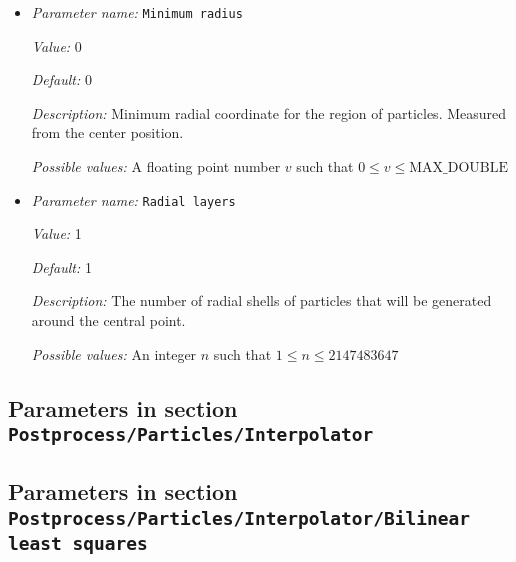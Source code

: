 \begin{itemize}
{\it Value:} 0


{\it Default:} 0


{\it Description:} Minimum longitude coordinate for the region of particles in degrees. Measured from the center position.


{\it Possible values:} A floating point number $v$ such that $0 \leq v \leq 360$
\item {\it Parameter name:} {\tt Minimum radius}
\label{parameters:Postprocess/Particles/Generator/Uniform radial/Minimum radius}


{\it Value:} 0


{\it Default:} 0


{\it Description:} Minimum radial coordinate for the region of particles. Measured from the center position.


{\it Possible values:} A floating point number $v$ such that $0 \leq v \leq \text{MAX\_DOUBLE}$
\item {\it Parameter name:} {\tt Radial layers}
\label{parameters:Postprocess/Particles/Generator/Uniform radial/Radial layers}


{\it Value:} 1


{\it Default:} 1


{\it Description:} The number of radial shells of particles that will be generated around the central point.


{\it Possible values:} An integer $n$ such that $1\leq n \leq 2147483647$
\end{itemize}

\subsection{Parameters in section \tt Postprocess/Particles/Interpolator}
\label{parameters:Postprocess/Particles/Interpolator}


\subsection{Parameters in section \tt Postprocess/Particles/Interpolator/Bilinear least squares}
\label{parameters:Postprocess/Particles/Interpolator/Bilinear_20least_20squares}

